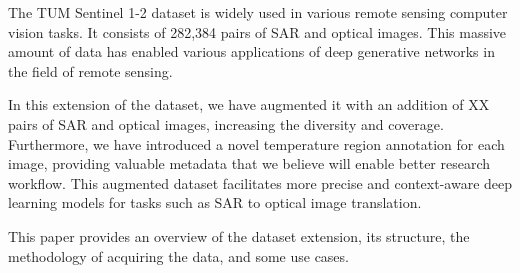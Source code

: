 The TUM Sentinel 1-2 dataset is widely used in various remote sensing computer vision tasks. It consists of 282,384 pairs of SAR and optical images. This massive amount of data has enabled various applications of deep generative networks in the field of remote sensing\cite{Zhang2023}.

In this extension of the dataset, we have augmented it with an addition of XX pairs of SAR and optical images, increasing the diversity and coverage. Furthermore, we have introduced a novel temperature region annotation for each image, providing valuable metadata that we believe will enable better research workflow. This augmented dataset facilitates more precise and context-aware deep learning models for tasks such as SAR to optical image translation.

This paper provides an overview of the dataset extension, its structure, the methodology of acquiring the data, and some use cases.